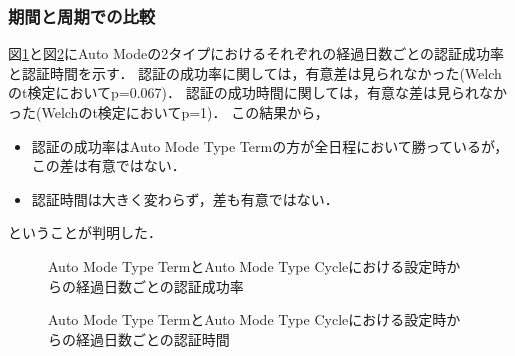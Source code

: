 \subsubsection{期間と周期での比較}
図\ref{fig:ex_auto_term_vs_auto_cycle_rate}と図\ref{fig:ex_auto_term_vs_auto_cycle_time}にAuto Modeの2タイプにおけるそれぞれの経過日数ごとの認証成功率と認証時間を示す．
認証の成功率に関しては，有意差は見られなかった(Welchのt検定においてp=0.067)．
認証の成功時間に関しては，有意な差は見られなかった(Welchのt検定においてp=1)．
この結果から，
\begin{itemize}
  \item 認証の成功率はAuto Mode Type Termの方が全日程において勝っているが，この差は有意ではない．
  \item 認証時間は大きく変わらず，差も有意ではない．
\end{itemize}
ということが判明した．

\begin{figure}[ht]
  \begin{center}
  \end{center}
  \caption{Auto Mode Type TermとAuto Mode Type Cycleにおける設定時からの経過日数ごとの認証成功率}
  \label{fig:ex_auto_term_vs_auto_cycle_rate}
\end{figure}

\begin{figure}[ht]
  \begin{center}
  \end{center}
  \caption{Auto Mode Type TermとAuto Mode Type Cycleにおける設定時からの経過日数ごとの認証時間}
  \label{fig:ex_auto_term_vs_auto_cycle_time}
\end{figure}

\newpage

